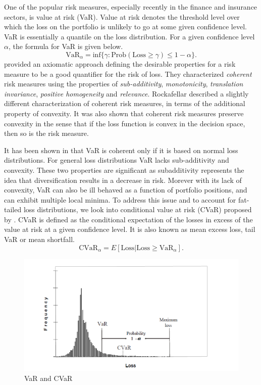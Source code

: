 One of the popular risk measures, especially recently in the finance and insurance sectors, is value at risk (VaR). Value at risk denotes the threshold level over which the loss on the portfolio is unlikely to go at some given confidence level. VaR is essentially a quantile on the loss distribution. For a given confidence level $\alpha$, the formula for VaR is given below.
\begin{equation*}
	\text{VaR}_{\alpha} = \text{inf}\{ \gamma : \text{Prob}(\text{Loss} \geq \gamma) \leq 1 - \alpha \}.
\end{equation*}
\cite{artzner1999coherent} provided an axiomatic approach defining the desirable properties for a risk measure to be a good quantifier for the risk of loss. They characterized \emph{coherent} risk measures using the properties of \emph{sub-additivity}, \emph{monotonicity}, \emph{translation invariance}, \emph{positive homogeneity} and \emph{relevance}. Rockafellar \cite{rockafellar_coherent_2007} described a slightly different characterization of coherent risk measures, in terms of the additional property of convexity. It was also shown that coherent risk measures preserve convexity in the sense that if the loss function is convex in the decision space, then so is the risk measure.

It has been shown in \cite{artzner1999coherent} that VaR is coherent only if it
is based on normal loss distributions. For general loss distributions VaR lacks
sub-additivity and convexity. These two properties are significant as
subadditivity represents the idea that diversification results in a decrease in
risk. Morever with its lack of convexity, VaR can also be ill behaved as a
function of portfolio positions, and can exhibit multiple local minima. To
address this issue and to account for fat-tailed loss distributions, we look
into conditional value at risk (CVaR) proposed by 
\cite{rockafellar_optimization_2000,rockafellar2002conditional}. CVaR is defined as the conditional expectation of the losses in excess of the value at risk at a given confidence level. It is also known as mean excess loss, tail VaR or mean shortfall.
\begin{equation}
\text{CVaR}_\alpha = E \left[\text{Loss} | \text{Loss} \geq \text{VaR}_\alpha \right].
\end{equation}

\begin{figure}[h!]
	\centering
	\includegraphics[width=0.95\linewidth]{figures/cvar.png}
	\caption{VaR and CVaR}\label{figvar}
\end{figure}

